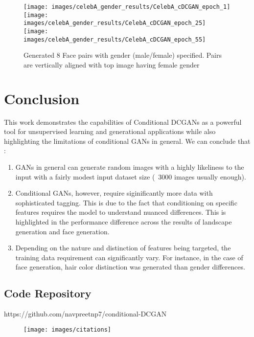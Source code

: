 \documentclass[twocolumn,10pt,cleanfoot]{asme2ej}
\begin{document}
\begin{figure*}
\texttt{[image: images/celebA\_gender\_results/CelebA\_cDCGAN\_epoch\_1]}
\texttt{[image: images/celebA\_gender\_results/CelebA\_cDCGAN\_epoch\_25]}
\texttt{[image: images/celebA\_gender\_results/CelebA\_cDCGAN\_epoch\_55]}
\caption{Generated 8 Face pairs with gender (male/female) specified. Pairs are vertically aligned with top image having female gender}
\label{celaba_gender}
\end{figure*}

\section{Conclusion}
This work demonstrates the capabilities of Conditional DCGANs as a powerful tool for unsupervised learning and generational applications while also highlighting the limitations of conditional GANs in general. We can conclude that :
\begin{enumerate}
    \item GANs in general can generate random images with a highly likeliness to the input with a fairly modest input dataset size (~3000 images usually enough).
    \item Conditional GANs, however, require siginificantly more data with sophisticated tagging. This is due to the fact that conditioning on specific features requires the model to understand nuanced differences. This is highlighted in the performance difference across the results of landscape generation and face generation.
    \item Depending on the nature and distinction of features being targeted, the training data requirement can significantly vary. For instance, in the case of face generation, hair color distinction was generated than gender differences.
\end{enumerate}

\subsection*{Code Repository} 
https://github.com/navpreetnp7/conditional-DCGAN

\begin{figure*}
\centerline{\texttt{[image: images/citations]}}
\end{figure*}
\end{document}
